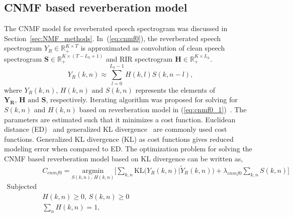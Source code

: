 \subsection{CNMF based reverberation model}
The CNMF model for reverberated speech spectrogram was discussed in Section~\ref{sec:NMF_methods}. In~(\ref{eq:cnmf0}), the reverberated speech spectrogram $Y_R\in\mathbb{R}_+^{K \times T}$ is approximated as convolution of clean speech spectrogram $\mathbf{S}\in\mathbb{R}_+^{K \times (T-L_h+1)}$ and RIR spectrogram $\mathbf{H}\in\mathbb{R}_+^{K \times L_h}$. 
\begin{equation}
Y_R(k,n)\approx \sum_{l=0}^{L_h-1} H(k,l)S(k,n-l),
\label{eq:cnmf0_1}
\end{equation}
where $Y_R(k,n)\text{, } H(k,n) \text{ and }S(k,n)$ represents the elements of $\mathbf{Y_R}\text{, } \mathbf{H} \text{ and }\mathbf{S}$, respectively.
Iterating algorithm was proposed for solving for $S(k,n)$ and $H(k,n)$ based on reverberation model in (\ref{eq:cnmf0_1})~\cite{kameoka2009robust,Kumar2011}. The parameters are estimated such that it minimizes a cost function. Euclidean distance (ED)~\cite{kameoka2009robust} and generalized KL divergence~\cite{Kumar2011} are commonly used cost functions. Generalized KL divergence (KL) as cost functions gives reduced modeling error when compared to ED. The optimization problem for solving the CNMF based reverberation model based on KL divergence can be written as,
\begin{align}
&C_{cnmf0} = \underset{S(k,n)\text{, }H(k,n)}{\text{argmin}} \Bigg[ \sum_{k,n} \text{KL} \bigg(Y_R(k,n)|\tilde{Y}_R(k,n)\bigg)+\lambda_{cnmf0}\sum_{k,n}S(k,n) \Bigg] \nonumber \\ 
\text{Subjected to}& \nonumber \\
&H(k,n) \geq 0\text{, }S(k,n)\geq 0 \nonumber \\ 
&\sum_{n}H(k,n) = 1 \text{,}
\label{eq:cost_cnmf0}
\end{align}

